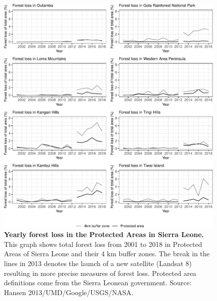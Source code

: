 \documentclass[
]{article}
\begin{document}
\begin{figure}[H]

{\centering \includegraphics{paper_REDD_replication_files/figure-latex/figForestlossPa-1} 

}

\caption{\textbf{Yearly forest loss in the Protected Areas in Sierra Leone.} This graph shows total forest loss from 2001 to 2018 in Protected Areas of Sierra Leone and their 4 km buffer zones. The break in the lines in 2013 denotes the launch of a new satellite (Landsat 8) resulting in more precise measures of forest loss. Protected area definitions come from the Sierra Leonean government. Source: Hansen 2013/UMD/Google/USGS/NASA.}\label{fig:figForestlossPa}
\end{figure}
\end{document}
